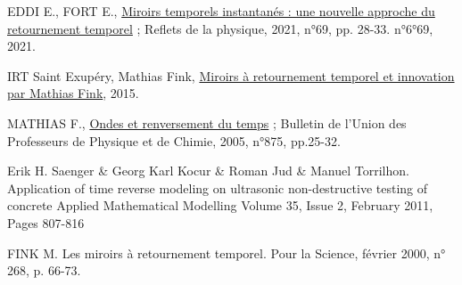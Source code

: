 \documentclass[11pt, a4paper]{article}
\begin{document}
\begin{thebibliography}{99}  

    EDDI E., FORT E., \href{https://www.refletsdelaphysique.fr/articles/refdp/abs/2021/02/refdp202169p28/refdp202169p28.html}{Miroirs temporels instantanés : une nouvelle approche du retournement temporel} ; Reflets de la physique, 2021, n°69, pp. 28-33. n°6°69, 2021.

    IRT Saint Exupéry, Mathias Fink, \href{https://www.youtube.com/watch?v=apJ06fHDojs}{Miroirs à retournement temporel et innovation par Mathias Fink}, 2015. 
    
    MATHIAS F., \href{https://uma.ensta-paris.fr/conf/tipe/2006/talks/TRM-Fink-final-UDP.pdf}{Ondes et renversement du temps} ; Bulletin de l'Union des Professeurs de Physique et de Chimie, 2005, n°875, pp.25-32. 
    
    Erik H. Saenger \& Georg Karl Kocur \& Roman Jud \& Manuel Torrilhon. Application of time reverse modeling on ultrasonic non-destructive testing of concrete Applied Mathematical Modelling Volume 35, Issue 2, February 2011, Pages 807-816 
    
    FINK M. Les miroirs à retournement temporel. Pour la Science, février 2000, n° 268, p. 66-73. 
    
    \end{thebibliography}
\end{document}
